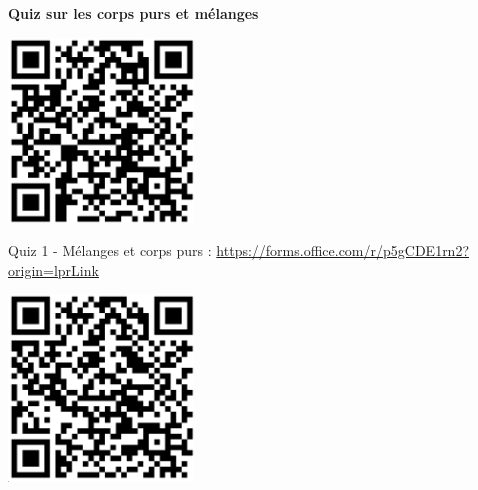 \documentclass[french, a4paper, 12pt, twocolumn, landscape]{article}
\begin{document}
\vspace{1cm}
	\noindent \textbf{Quiz sur les corps purs et mélanges}
\begin{center}
	\begin{minipage}{.12\textwidth}
		\centering
		\includegraphics[width=.5\textwidth]{Quiz1.png}
		
		Quiz 1 - Mélanges et corps purs : \url{https://forms.office.com/r/p5gCDE1rn2?origin=lprLink}
	\end{minipage}\hspace{.5cm}
	\begin{minipage}{.12\textwidth}
		\centering
		\includegraphics[width=.5\textwidth]{Quiz2.png}


\end{minipage}
\end{center}
\end{document}
